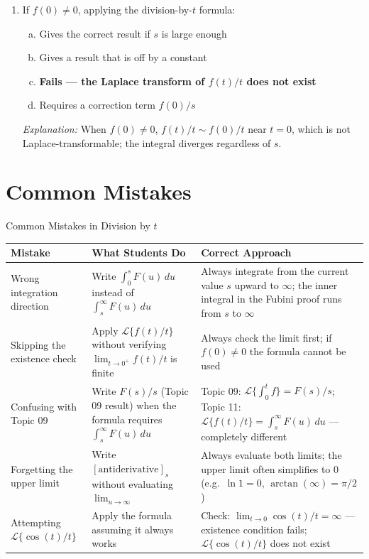 \documentclass[12pt,a4paper]{article}
\begin{document}
\begin{enumerate}[leftmargin=2em, label=\textbf{MCQ\arabic*.}]
\medskip
\item If $f(0)\neq 0$, applying the division-by-$t$ formula:
\begin{enumerate}[(a)]
  \item Gives the correct result if $s$ is large enough
  \item Gives a result that is off by a constant
  \item \textbf{Fails --- the Laplace transform of $f(t)/t$ does not exist}
  \item Requires a correction term $f(0)/s$
\end{enumerate}
\textit{Explanation:} When $f(0)\neq 0$, $f(t)/t \sim f(0)/t$ near $t=0$,
which is not Laplace-transformable; the integral diverges regardless of $s$.

\end{enumerate}

\section{Common Mistakes}

\begin{mistakebox}{Common Mistakes in Division by $t$}
\begin{tabular}{@{}p{4.5cm}p{4.5cm}p{5cm}@{}}
\toprule
\textbf{Mistake} & \textbf{What Students Do} & \textbf{Correct Approach} \\
\midrule
Wrong integration direction &
  Write $\int_0^s F(u)\,du$ instead of $\int_s^\infty F(u)\,du$ &
  Always integrate from the current value $s$ upward to $\infty$; the inner
  integral in the Fubini proof runs from $s$ to $\infty$ \\[6pt]
Skipping the existence check &
  Apply $\mathcal{L}\{f(t)/t\}$ without verifying
  $\lim_{t\to 0^+}f(t)/t$ is finite &
  Always check the limit first; if $f(0)\neq 0$ the formula cannot be used \\[6pt]
Confusing with Topic 09 &
  Write $F(s)/s$ (Topic 09 result) when the formula requires
  $\int_s^\infty F(u)\,du$ &
  Topic 09: $\mathcal{L}\{\int_0^t f\}=F(s)/s$; Topic 11:
  $\mathcal{L}\{f(t)/t\}=\int_s^\infty F(u)\,du$ --- completely different \\[6pt]
Forgetting the upper limit &
  Write $\left[\text{antiderivative}\right]_s$ without evaluating
  $\lim_{u\to\infty}$ &
  Always evaluate both limits; the upper limit often simplifies to $0$
  (e.g.\ $\ln 1 = 0$, $\arctan(\infty) = \pi/2$) \\[6pt]
Attempting $\mathcal{L}\{\cos(t)/t\}$ &
  Apply the formula assuming it always works &
  Check: $\lim_{t\to 0}\cos(t)/t = \infty$ --- existence condition fails;
  $\mathcal{L}\{\cos(t)/t\}$ does not exist \\
\bottomrule
\end{tabular}
\end{mistakebox}
\end{document}

